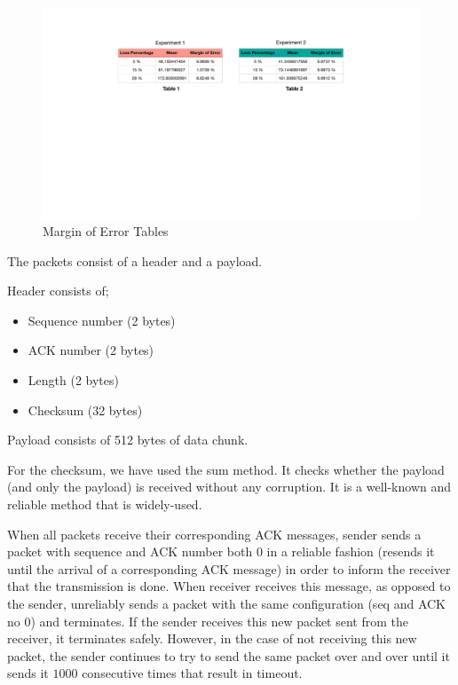 \documentclass[conference]{IEEEtran}
\begin{document}
\begin{figure}[t]
\caption*{Margin of Error Tables}
\centerline{\includegraphics[width=\textwidth]{tables.pdf}}
\label{graph}
\end{figure}
    
    The packets consist of a header and a payload. 
    
    Header consists of; 
    \begin{itemize}
        \item Sequence number (2 bytes)
        \item ACK number (2 bytes)
        \item Length (2 bytes)
        \item Checksum (32 bytes)
    \end{itemize} 
    
    Payload consists of 512 bytes of data chunk.
    
    For the checksum, we have used the  sum method. It checks whether the payload (and only the payload) is received without any corruption. It is a well-known and reliable method that is widely-used. 
    
    When all packets receive their corresponding ACK messages, sender sends a packet with sequence and ACK number both $0$ in a reliable fashion (resends it until the arrival of a corresponding ACK message) in order to inform the receiver that the transmission is done. When receiver receives this message, as opposed to the sender, unreliably sends a packet with the same configuration (seq and ACK no $0$) and terminates. If the sender receives this new packet sent from the receiver, it terminates safely. However, in the case of not receiving this new packet, the sender continues to try to send the same packet over and over until it sends it $1000$ consecutive times that result in timeout.
    
\end{document}
